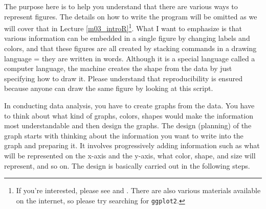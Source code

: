 \documentclass{ltjsbook}
\begin{document}
The purpose here is to help you understand that there are various ways to represent figures. The details on how to write the program will be omitted as we will cover that in Lecture \ref{m03_introR}\footnote{If you're interested, please see \textcite{Kieran2018} and \textcite{Kinosady2021}. There are also various materials available on the internet, so please try searching for \texttt{ggplot2}.}. What I want to emphasize is that various information can be embedded in a single figure by changing labels and colors, and that these figures are all created by stacking commands in a drawing language = they are written in words. Although it is a special language called a computer language, the machine creates the shape from the data by just specifying how to draw it. Please understand that reproducibility is ensured because anyone can draw the same figure by looking at this script.

In conducting data analysis, you have to create graphs from the data. You have to think about what kind of graphs, colors, shapes would make the information most understandable and then design the graphs. The design (planning) of the graph starts with thinking about the information you want to write into the graph and preparing it. It involves progressively adding information such as what will be represented on the x-axis and the y-axis, what color, shape, and size will represent, and so on. The design is basically carried out in the following steps.

\end{document}
